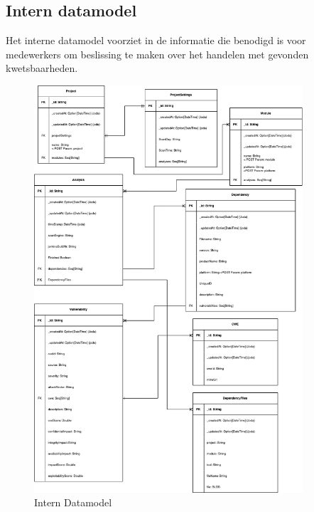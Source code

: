 \subsection{Intern datamodel}
Het interne datamodel voorziet in de informatie die benodigd is voor medewerkers om beslissing te maken over het handelen met gevonden kwetsbaarheden.

\begin{figure}[bth]
  \myfloatalign
  \includegraphics[width=10cm]{gfx/SOUPAPI-SOUPAPI DM}
  \caption{Intern Datamodel}
  \label{fig:SOUP-SoupApiDm}
\end{figure}
